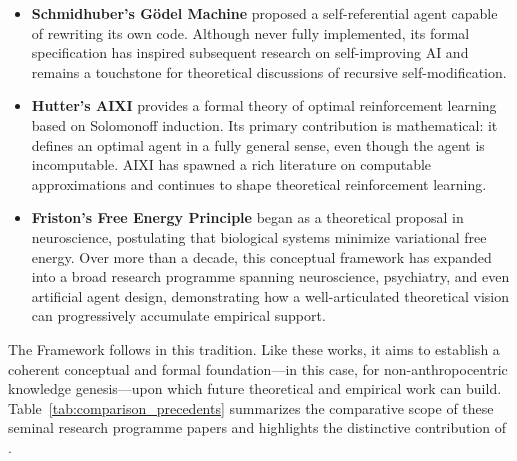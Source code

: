 \begin{itemize}
    \item \textbf{Schmidhuber's G\"odel Machine} \cite{schmidhuber2007} proposed a self-referential agent capable of rewriting its own code. Although never fully implemented, its formal specification has inspired subsequent research on self-improving AI and remains a touchstone for theoretical discussions of recursive self-modification.
    
    \item \textbf{Hutter's AIXI} \cite{hutter2005} provides a formal theory of optimal reinforcement learning based on Solomonoff induction. Its primary contribution is mathematical: it defines an optimal agent in a fully general sense, even though the agent is incomputable. AIXI has spawned a rich literature on computable approximations and continues to shape theoretical reinforcement learning.
    
    \item \textbf{Friston's Free Energy Principle} \cite{friston2010} began as a theoretical proposal in neuroscience, postulating that biological systems minimize variational free energy. Over more than a decade, this conceptual framework has expanded into a broad research programme spanning neuroscience, psychiatry, and even artificial agent design, demonstrating how a well-articulated theoretical vision can progressively accumulate empirical support.
\end{itemize}

The \Apeiron{} Framework follows in this tradition. Like these works, it aims to establish a coherent conceptual and formal foundation---in this case, for non-anthropocentric knowledge genesis---upon which future theoretical and empirical work can build. Table~\ref{tab:comparison_precedents} summarizes the comparative scope of these seminal research programme papers and highlights the distinctive contribution of \Apeiron{}.

